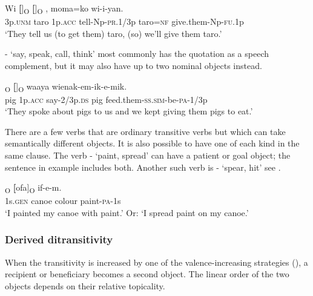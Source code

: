 \ea%
\label{ex:5:x955}
\gll Wi  \textbf{[}]\textsubscript{O}  \textbf{[}]\textsubscript{O}  ,  moma=ko wi-i-yan. \\
     3p.\textsc{unm}  taro  1p.\textsc{acc}  tell-Np-\textsc{pr}.1/3p  taro=\textsc{nf} give.them-Np-\textsc{fu}.1p \\
\glt `They tell us (to get them) taro, (so) we'll give them taro.'
\z

- `say, speak, call, think' most commonly has the quotation as a speech complement, but it may also have up to two nominal objects instead.

\ea%
\label{ex:5:x956}
\textsubscript{O}  \textbf{[}]\textsubscript{O}    waaya  wienak-em-ik-e-mik. \\
     pig  1p.\textsc{acc}  say-2/3p.\textsc{ds}  pig  feed.them-\textsc{ss}.\textsc{sim}-be-\textsc{pa}-1/3p \\
\glt `They spoke about pigs to us and we kept giving them pigs to eat.'
\z

There are a few verbs that are ordinary transitive verbs but which can take semantically different objects. It is also possible to have one of each kind in the same clause. The verb - `paint, spread' can have a patient or goal object; the sentence in example  includes both. Another such verb is \nobreakdash- `spear, hit' see .  

\ea%
\label{ex:5:x944}
\textsubscript{O}  \textbf{[}ofa]\textsubscript{O}  if-e-m. \\
     1s.\textsc{gen}  canoe  colour  paint-\textsc{pa}-1s \\
\glt `I painted my canoe with paint.' Or: `I spread paint on my canoe.'
\z

\subsubsection[Derived ditransitivity ]{Derived ditransitivity} \label{sec:5.3.2.2}

When the transitivity is increased by one of the valence-increasing strategies (), a recipient or beneficiary  becomes a second object. The linear order of the two objects depends on their relative topicality.

